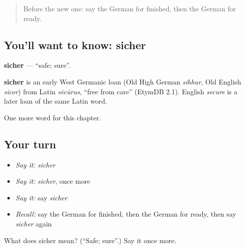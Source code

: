 \label{lesson:GE-C134-sicher}



\begin{quote}
Before the new one: say the German for finished, then the German for ready.
\end{quote}

\subsection*{You'll want to know: sicher}
\textbf{sicher} — \textquotedblleft{}safe; sure\textquotedblright{}.

\begin{cousinweb}
\textbf{sicher} is an early West Germanic loan (Old High German \emph{sihhur}, Old English \emph{sicor}) from Latin \emph{sēcūrus}, \textquotedblleft{}free from care\textquotedblright{} (EtymDB 2.1). English \emph{secure} is a later loan of the same Latin word.
\end{cousinweb}

\begin{grammarlens}[title={What you've built}]
One more word for this chapter.
\end{grammarlens}

\subsection*{Your turn}
\begin{itemize}
\raggedright
  \item \emph{Say it:} \emph{sicher}
  \item \emph{Say it:} \emph{sicher}, once more
  \item \emph{Say it:} say \emph{sicher}
  \item \emph{Recall:} say the German for finished, then the German for ready, then say \emph{sicher} again
\end{itemize}

\begin{tcolorbox}[breakable,colback=teal!4,colframe=teal!35!black,title={Before you move on}]
What does sicher mean? (\textquotedblleft{}Safe; sure\textquotedblright{}.) Say it once more.
\end{tcolorbox}

